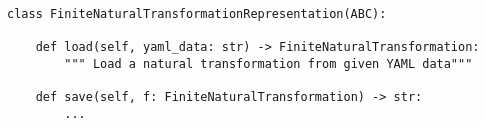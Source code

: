 \begin{verbatim}
class FiniteNaturalTransformationRepresentation(ABC):

    def load(self, yaml_data: str) -> FiniteNaturalTransformation:
        """ Load a natural transformation from given YAML data"""

    def save(self, f: FiniteNaturalTransformation) -> str:
        ...
\end{verbatim}